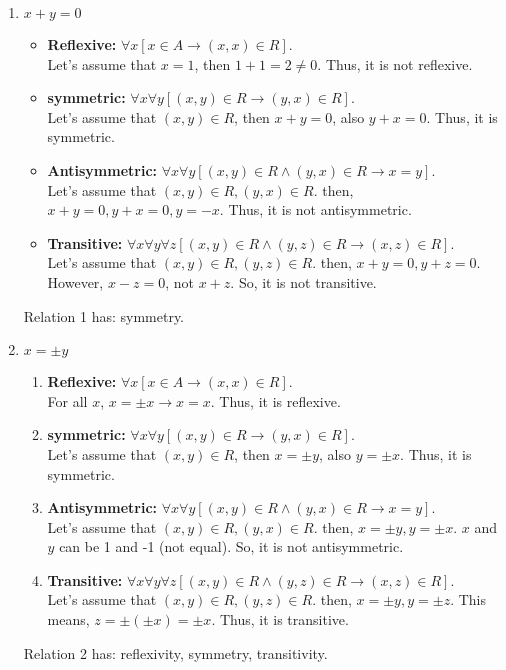 \begin{enumerate}
    \item $x + y = 0$
    \begin{itemize}
        \item \textbf{Reflexive: } $\forall x [x \in A \to (x, x) \in R]$.\\
        Let's assume that $x = 1$, then $1 + 1 = 2 \neq 0$. Thus, it is not reflexive.
        \item \textbf{symmetric: } $\forall x \forall y[(x, y) \in R \to (y, x) \in R]$.\\
        Let's assume that $(x, y) \in R$, then $x + y = 0$, also $y + x = 0$. Thus, it is symmetric.
        \item \textbf{Antisymmetric: } $\forall x \forall y [(x, y) \in R \wedge (y, x) \in R \to x = y]$. \\
        Let's assume that $(x, y) \in R, (y, x) \in R$. then, $x + y = 0, y + x = 0, y = -x$. Thus, it is not antisymmetric.
        \item \textbf{Transitive: } $\forall x \forall y \forall z [(x, y) \in R \wedge (y, z) \in R \to (x, z) \in R]$.\\
        Let's assume that $(x, y) \in R, (y, z) \in R$. then, $x + y = 0, y + z = 0$. However, $x - z = 0$, not $x+z$. So, it is not transitive.
    \end{itemize}
    Relation 1 has: symmetry.
    \item $x = \pm y$
    \begin{enumerate}
        \item \textbf{Reflexive: } $\forall x [x \in A \to (x, x) \in R]$.\\
        For all $x$, $x = \pm x \to x = x$. Thus, it is reflexive.
        \item \textbf{symmetric: } $\forall x \forall y[(x, y) \in R \to (y, x) \in R]$.\\
        Let's assume that $(x, y) \in R$, then $x = \pm y$, also $y = \pm x$. Thus, it is symmetric.
        \item \textbf{Antisymmetric: } $\forall x \forall y [(x, y) \in R \wedge (y, x) \in R \to x = y]$. \\
        Let's assume that $(x, y) \in R, (y, x) \in R$. then, $x = \pm y, y = \pm x$. $x$ and $y$ can be 1 and -1 (not equal). So, it is not antisymmetric.
        \item \textbf{Transitive: } $\forall x \forall y \forall z [(x, y) \in R \wedge (y, z) \in R \to (x, z) \in R]$.\\
        Let's assume that $(x, y) \in R, (y, z) \in R$. then, $x = \pm y, y = \pm z$. This means, $z = \pm (\pm x) = \pm x$. Thus, it is transitive.
    \end{enumerate}
    Relation 2 has: reflexivity, symmetry, transitivity.


\end{enumerate}

